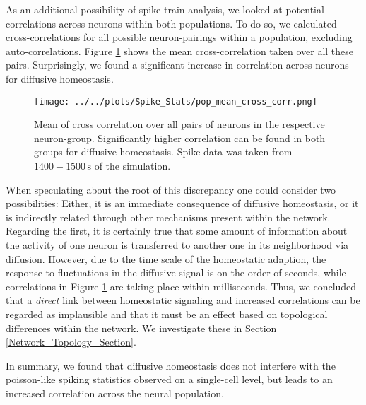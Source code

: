 \documentclass[10pt,a4paper]{article}
\begin{document}
As an additional possibility of spike-train analysis, we looked at potential correlations across neurons within both populations. To do so, we calculated cross-correlations for all possible neuron-pairings within a population, excluding auto-correlations. Figure \ref{Pop_Mean_Cross_Corr} shows the mean cross-correlation taken over all these pairs. Surprisingly, we found a significant increase in correlation across neurons for diffusive homeostasis. 
\begin{figure}

\texttt{[image: ../../plots/Spike\_Stats/pop\_mean\_cross\_corr.png]}
\caption{Mean of cross correlation over all pairs of neurons in the respective neuron-group. Significantly higher correlation can be found in both groups for diffusive homeostasis. Spike data was taken from $\mathrm{1400-1500\,s}$ of the simulation.}
\label{Pop_Mean_Cross_Corr}
\end{figure}
When speculating about the root of this discrepancy one could consider two possibilities: Either, it is an immediate consequence of diffusive homeostasis, or it is indirectly related through other mechanisms present within the network. Regarding the first, it is certainly true that some amount of information about the activity of one neuron is transferred to another one in its neighborhood via diffusion. However, due to the time scale of the homeostatic adaption, the response to fluctuations in the diffusive signal is on the order of seconds, while correlations in Figure \ref{Pop_Mean_Cross_Corr} are taking place within milliseconds. Thus, we concluded that a \emph{direct} link between homeostatic signaling and increased correlations can be regarded as implausible and that it must be an effect based on topological differences within the network. We investigate these in Section \ref{Network_Topology_Section}.

In summary, we found that diffusive homeostasis does not interfere with the poisson-like spiking statistics observed on a single-cell level, but leads to an increased correlation across the neural population. 
\end{document}
